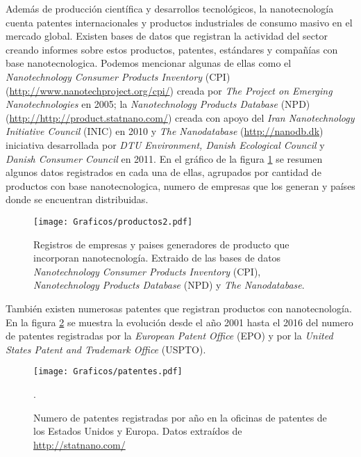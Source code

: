 	Además de producción científica y desarrollos tecnológicos, la nanotecnología cuenta patentes internacionales y productos industriales de consumo masivo en el mercado global. Existen bases de datos que registran la actividad del sector creando informes sobre estos productos, patentes, estándares y compañías con base nanotecnologica. Podemos mencionar algunas de ellas como el \textit{Nanotechnology Consumer Products Inventory} (CPI) (\url{http://www.nanotechproject.org/cpi/}) creada por \textit{The Project on Emerging Nanotechnologies} en 2005\cite{Vance2015}; la \textit{Nanotechnology Products Database} (NPD) (\url{http://http://product.statnano.com/}) creada con apoyo del \textit{Iran Nanotechnology Initiative Council} (INIC) en 2010 y \textit{The Nanodatabase} (\url{http://nanodb.dk}) iniciativa desarrollada por \textit{DTU Environment, Danish Ecological Council} y \textit{Danish Consumer Council} en 2011. En el gráfico de la figura \ref{fig:productos} se resumen algunos datos registrados en cada una de ellas, agrupados por cantidad de productos con base nanotecnologica, numero de empresas que los generan y países donde se encuentran distribuidas.

		\begin{figure}[ht!]
 			\begin{center}
 			\texttt{[image: Graficos/productos2.pdf]}
 			\caption[Cantidad de productos, compañías y origen con base nanotecnologica]{Registros de empresas y paises generadores de producto que incorporan nanotecnología. Extraido de las bases de datos \textit{Nanotechnology Consumer Products Inventory} (CPI), \textit{Nanotechnology Products Database} (NPD) y \textit{The Nanodatabase}.}
 			\label{fig:productos}
 		    \end{center}
 		    \end{figure}

 	También existen numerosas patentes que registran productos con nanotecnología. En la figura \ref{fig:patentes} se muestra la evolución desde el año 2001 hasta el 2016 del numero de patentes registradas por la \textit{European Patent Office} (EPO) y por la \textit{United States Patent and Trademark Office} (USPTO).

		\begin{figure}[ht!]
 			\begin{center}
 			\texttt{[image: Graficos/patentes.pdf]}
 			\caption[Numero de patentes de productos en base nanotecnologica]{Numero de patentes registradas por año en la oficinas de patentes de los Estados Unidos y Europa. Datos extraídos de \url{http://statnano.com/}}.
 			\label{fig:patentes}
 		    \end{center}
 		    \end{figure}

